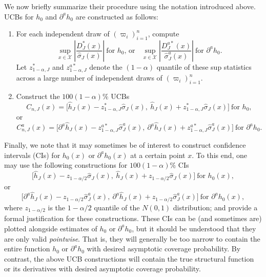 \documentclass[
]{jss}
\begin{document}
We now briefly summarize their procedure using the notation introduced
above. UCBs for \(h_0\) and \(\partial^a h_0\) are constructed as
follows:

\begin{enumerate}
\item For each independent draw of $(\varpi_i)_{i=1}^n$, compute
\begin{equation} \label{eq:z_star-J-UCB}
 \sup_{x\in \mathcal{X}} \left| \frac{D_J^*(x)}{\hat \sigma_J(x)} \right|~\mbox{for $h_0$, or}~~~~\sup_{x \in \mathcal{X}} \left| \frac{D_J^{a*}(x)}{\hat \sigma_J^a(x)} \right|~\mbox{for $\partial^a h_0$}.
\end{equation}
Let $z_{1-\alpha,J}^*$ and $z_{1-\alpha,J}^{a*}$ denote the $(1-\alpha )$ quantile of
these sup statistics across a large number of independent draws of $(\varpi_i)_{i=1}^n$.
\item Construct the $100(1-\alpha)\%$ UCBs
\[
 C_{n,J}(x) = \bigg[ \hat{h}_{J}(x) -  z_{1-\alpha,J}^* \hat \sigma_{J}(x) , ~  \hat{h}_{J}(x) + z_{1-\alpha,J}^* \hat \sigma_{J}(x) \bigg] ~\mbox{for $h_0$},
\]
or
\[
 C_{n,J}^a(x) = \bigg[ \partial^a \hat{h}_{J}(x) - z_{1-\alpha,J}^{a*} \hat \sigma_{J}^a(x) ,~ \partial^a \hat{h}_{J}(x) +  z_{1-\alpha,J}^{a*} \hat \sigma_{J}^a(x) \bigg] ~\mbox{for $\partial^a h_0$}.
\]
\end{enumerate}

Finally, we note that it may sometimes be of interest to construct
confidence intervals (CIs) for \(h_0(x)\) or \(\partial^a h_0(x)\) at a
certain point \(x\). To this end, one may use the following
constructions for \(100(1-\alpha)\%\) CIs \[
 \bigg[ \hat{h}_{J}(x) -  z_{1-\alpha/2} \hat \sigma_{J}(x) , ~  \hat{h}_{J}(x) + z_{1-\alpha/2} \hat \sigma_{J}(x) \bigg] ~\mbox{for $h_0(x)$},
\] or \[
 \bigg[ \partial^a \hat{h}_{J}(x) - z_{1-\alpha/2} \hat \sigma_{J}^a(x) ,~ \partial^a \hat{h}_{J}(x) +  z_{1-\alpha/2} \hat \sigma_{J}^a(x) \bigg] ~\mbox{for $\partial^a h_0(x)$},
\] where \(z_{1-\alpha/2}\) is the \(1-\alpha/2\) quantile of the
\(N(0,1)\) distribution; \citet{CC15Reg} and \citet{BCCK} provide a
formal justification for these constructions. These CIs can be (and
sometimes are) plotted alongside estimates of \(h_0\) or
\(\partial^a h_0\), but it should be understood that they are only valid
\emph{pointwise}. That is, they will generally be too narrow to contain
the entire function \(h_0\) or \(\partial^a h_0\) with desired
asymptotic coverage probability. By contrast, the above UCB
constructions will contain the true structural function or its
derivatives with desired asymptotic coverage probability.
\end{document}
